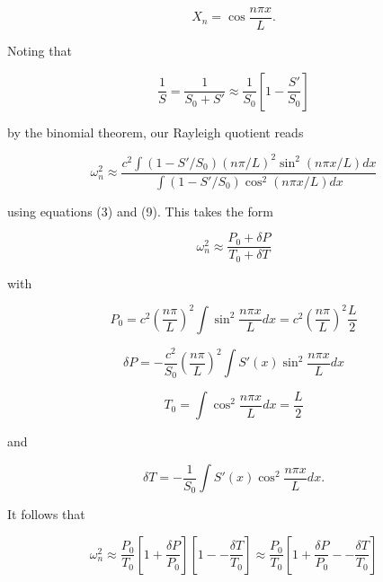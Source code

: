   \begin{equation*}X_n=\cos \dfrac{n \pi x}{L} . \tag{10}\end{equation*} 

  Noting that 

  \begin{equation*}\dfrac{1}{S}=\dfrac{1}{S_0+S'} \approx 
  \dfrac{1}{S_0}\left[1-\dfrac{S'}{S_0}\right] \tag{11}\end{equation*} 

  \noindent{}by the binomial theorem, our Rayleigh quotient reads 

  \begin{equation*}\omega_n^2 \approx \dfrac{c^2 \int{(1-S'/S_0)(n \pi/L)^2 
  \sin^2(n \pi x/L) dx}}{\int{(1-S'/S_0) \cos^2(n \pi x/L) dx}} 
  \tag{12}\end{equation*} 

  \noindent{}using equations (3) and (9). This takes the form 

  \begin{equation*}\omega_n^2 \approx \dfrac{P_0 + \delta P}{T_0 + \delta T} 
  \tag{13}\end{equation*} 

  \noindent{}with 

  \begin{equation*}P_0=c^2 \left(\dfrac{n \pi}{L}\right)^2 \int{ \sin^2 
  \dfrac{n \pi x}{L} dx}=c^2 \left(\dfrac{n \pi}{L}\right)^2 \dfrac{L}{2} 
  \tag{14}\end{equation*} 

  \begin{equation*}\delta P=-\dfrac{c^2}{S_0} \left(\dfrac{n \pi}{L}\right)^2 
  \int{S'(x) \sin^2 \dfrac{n \pi x}{L} dx} \tag{15}\end{equation*} 

  \begin{equation*}T_0=\int{ \cos^2 \dfrac{n \pi x}{L} dx} =\dfrac{L}{2} 
  \tag{16}\end{equation*} 

  \noindent{}and 

  \begin{equation*}\delta T=-\dfrac{1}{S_0} \int{S'(x) \cos^2 \dfrac{n \pi 
  x}{L} dx} . \tag{17}\end{equation*} 

  It follows that 

  \begin{equation*}\omega_n^2 \approx \dfrac{P_0}{T_0}\left[1 + \dfrac{\delta 
  P}{P_0}\right] \left[1 -- \dfrac{\delta T}{T_0}\right]\approx 
  \dfrac{P_0}{T_0}\left[1 + \dfrac{\delta P}{P_0} -- \dfrac{\delta 
  T}{T_0}\right]\end{equation*} 

